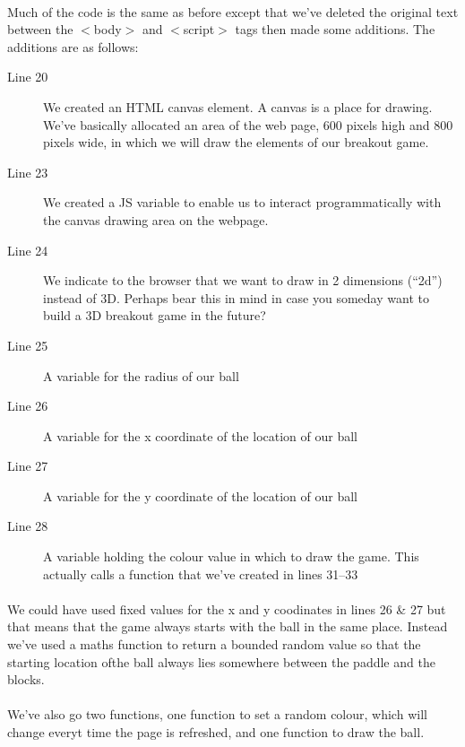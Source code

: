 \documentclass[10pt, a4paper, oneside]{article}
\begin{document}
\paragraph{} Much of the code is the same as before except that we've deleted the original text between the $<$body$>$ and $<$script$>$ tags then made some additions. The additions are as follows:

\begin{description}
\item[Line 20] We created an HTML canvas element. A canvas is a place for drawing. We've basically allocated an area of the web page, 600 pixels high and 800 pixels wide, in which we will draw the elements of our breakout game.
\item[Line 23] We created a JS variable to enable us to interact programmatically with the canvas drawing area on the webpage.
\item[Line 24] We indicate to the browser that we want to draw in 2 dimensions (``2d'') instead of 3D. Perhaps bear this in mind in case you someday want to build a 3D breakout game in the future?
\item[Line 25] A variable for the radius of our ball
\item[Line 26] A variable for the x coordinate of the location of our ball
\item[Line 27] A variable for the y coordinate of the location of our ball
\item[Line 28] A variable holding the colour value in which to draw the game. This actually calls a function that we've created in lines 31--33
\end{description}

\paragraph{} We could have used fixed values for the x and y coodinates in lines 26 \& 27 but that means that the game always starts with the ball in the same place. Instead we've used a maths function to return a bounded random value so that the starting location ofthe ball always lies somewhere between the paddle and the blocks.

\paragraph{} We've also go two functions, one function to set a random colour, which will change everyt time the page is refreshed, and one function to draw the ball.
\end{document}
